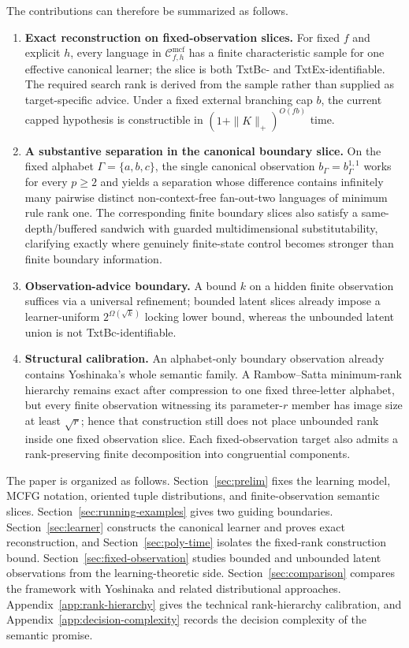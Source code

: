 \documentclass[11pt,a4paper]{article}
\numberwithin{equation}{section}
\theoremstyle{plain}
\theoremstyle{definition}
\theoremstyle{remark}
\newcommand{\Cmcf}[2]{\mathcal{C}^{\mathrm{mcf}}_{#1,#2}}
\begin{document}
The contributions can therefore be summarized as follows.
\begin{enumerate}[leftmargin=*]
\item \textbf{Exact reconstruction on fixed-observation slices.}
For fixed $f$ and explicit $h$, every language in $\Cmcf{f}{h}$ has a finite
characteristic sample for one effective canonical learner; the slice is both
TxtBc- and TxtEx-identifiable.  The required search rank is derived from the
sample rather than supplied as target-specific advice.  Under a fixed external
branching cap $b$, the current capped hypothesis is constructible in
$(1+\|K\|_+)^{O(fb)}$ time.
\item \textbf{A substantive separation in the canonical boundary slice.}
On the fixed alphabet $\Gamma=\{a,b,c\}$, the single canonical observation
$b_\Gamma=b_\Gamma^{1,1}$ works for every $p\ge2$ and yields a separation
whose difference contains infinitely many pairwise distinct non-context-free
fan-out-two languages of minimum rule rank one.  The corresponding finite
boundary slices also satisfy a same-depth/buffered sandwich with guarded
multidimensional substitutability, clarifying exactly where genuinely
finite-state control becomes stronger than finite boundary information.
\item \textbf{Observation-advice boundary.}
A bound $k$ on a hidden finite observation suffices via a universal refinement;
bounded latent slices already impose a learner-uniform
$2^{\Omega(\sqrt{k})}$ locking lower bound, whereas the unbounded latent union
is not TxtBc-identifiable.
\item \textbf{Structural calibration.}
An alphabet-only boundary observation already contains Yoshinaka's whole
semantic family.  A Rambow--Satta minimum-rank hierarchy remains exact after
compression to one fixed three-letter alphabet, but every finite observation
witnessing its parameter-$r$ member has image size at least $\sqrt r$; hence
that construction still does not place unbounded rank inside one fixed
observation slice.  Each fixed-observation target also admits a rank-preserving
finite decomposition into congruential components.
\end{enumerate}

The paper is organized as follows.  Section~\ref{sec:prelim} fixes the learning
model, MCFG notation, oriented tuple distributions, and finite-observation
semantic slices.  Section~\ref{sec:running-examples} gives two guiding
boundaries.  Section~\ref{sec:learner} constructs the canonical learner and
proves exact reconstruction, and Section~\ref{sec:poly-time} isolates the
fixed-rank construction bound.  Section~\ref{sec:fixed-observation} studies
bounded and unbounded latent observations from the learning-theoretic side.
Section~\ref{sec:comparison} compares the framework with Yoshinaka and related
distributional approaches.  Appendix~\ref{app:rank-hierarchy} gives the
technical rank-hierarchy calibration, and Appendix~\ref{app:decision-complexity}
records the decision complexity of the semantic promise.
\end{document}
